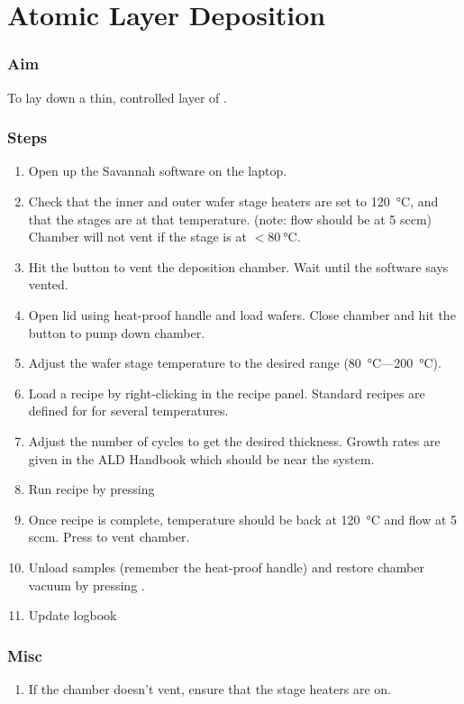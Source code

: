 \section{Atomic Layer Deposition}
\subsubsection{Aim}
To lay down a thin, controlled layer of .

\subsubsection{Steps}
\begin{enumerate}
\item Open up the Savannah software on the laptop.
\item Check that the inner and outer wafer stage heaters are set to \SI{120}{\degreeCelsius}, and that the stages
are at that temperature. (note:  flow should be at 5 sccm) Chamber will not vent if the stage is at $<\SI{80}{\degreeCelsius}$.
\item Hit the  button to vent the deposition chamber. Wait until the software says vented.
\item Open lid using heat-proof handle and load wafers. Close chamber and hit the  button to pump down chamber.
\item Adjust the wafer stage temperature to the desired range (\SI{80}{\degreeCelsius}---\SI{200}{\degreeCelsius}).
\item Load a recipe by right-clicking in the recipe panel. Standard recipes are defined for  for several temperatures.
\item Adjust the number of cycles to get the desired thickness. Growth rates are given in the ALD Handbook which should be near the system.
\item Run recipe by pressing 
\item Once recipe is complete, temperature should be back at \SI{120}{\degreeCelsius} and  flow at 5 sccm. Press  to vent chamber.
\item Unload samples (remember the heat-proof handle) and restore chamber vacuum by pressing .
\item Update logbook
\end{enumerate}

\subsubsection{Misc}
\begin{enumerate}
\item If the chamber doesn't vent, ensure that the stage heaters are on.
\end{enumerate}
\newpage


